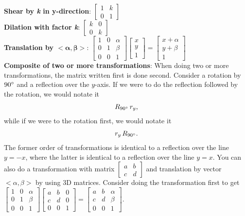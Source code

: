 \documentclass[12pt, letterpaper]{article}
\begin{document}
\textbf{Shear by \textit{k} in y-direction}: \(
\begin{bmatrix} 
1 & k \\ 
0 & 1 
\end{bmatrix}\)\vspace{1em}\\

\textbf{Dilation with factor \textit{k}}: \(
\begin{bmatrix} 
k & 0 \\ 
0 & k 
\end{bmatrix}\)\vspace{1em}\\

\textbf{Translation by \(\boldsymbol{<\alpha,\beta>}\)}: \(
\begin{bmatrix} 
1 & 0 & \alpha \\ 
0 & 1 & \beta \\
0 & 0 & 1
\end{bmatrix}
\begin{bmatrix} 
x \\ 
y \\
1
\end{bmatrix}=
\begin{bmatrix}
x+\alpha \\
y+\beta \\
1
\end{bmatrix}\) \vspace{1em}\\

\textbf{Composite of two or more transformations}: When doing two or more transformations, the matrix written first is done second. Consider a rotation by \(90\degree\) and a reflection over the \(y\)-axis. If we were to do the reflection followed by the rotation, we would notate it \[R_{90\degree} \, r_y\text{,}\] while if we were to the rotation first, we would notate it \[r_y \, R_{90\degree}\text{.}\] The former order of transformations is identical to a reflection over the line \(y=-x\), where the latter is identical to a reflection over the line \(y=x\). You can also do a transformation with matrix \(\begin{bmatrix} 
a & b \\
c & d
\end{bmatrix}\) and translation by vector \(<\alpha,\beta>\) by using 3D matrices. Consider doing the transformation first to get \(\begin{bmatrix} 
1 & 0 & \alpha \\ 
0 & 1 & \beta \\
0 & 0 & 1
\end{bmatrix}
\begin{bmatrix} 
a & b & 0 \\ 
c & d & 0 \\
0 & 0 & 1
\end{bmatrix}
=
\begin{bmatrix} 
a & b & \alpha \\ 
c & d & \beta \\
0 & 0 & 1
\end{bmatrix}\).
\vspace{1em}\\
\end{document}
